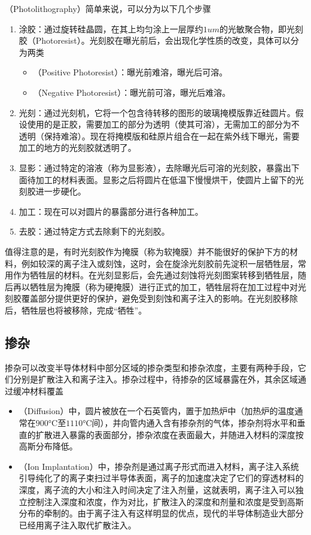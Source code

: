 （Photolithography）简单来说，可以分为以下几个步骤
\begin{enumerate}
    \item 涂胶：通过旋转硅晶圆，在其上均匀涂上一层厚约$1\si{um}$的光敏聚合物，即光刻胶（Photoresist）。光刻胶在曝光前后，会出现化学性质的改变，具体可以分为两类
    \begin{itemize}
        \item {}（Positive Photoresist）\hspace{0.35em}：曝光前难溶，曝光后可溶。
        \item {}（Negative Photoresist）\hspace{0.00em}：曝光前可溶，曝光后难溶。
    \end{itemize}
    \item 光刻：通过光刻机，它将一个包含待转移的图形的玻璃掩模版靠近硅圆片。假设使用的是正胶，需要加工的部分为透明（使其可溶），无需加工的部分为不透明（保持难溶）。现在将掩模版和硅原片组合在一起在紫外线下曝光，需要加工的地方的光刻胶就透明了。
    \item 显影：通过特定的溶液（称为显影液），去除曝光后可溶的光刻胶，暴露出下面待加工的材料表面。显影之后将圆片在低温下慢慢烘干，使圆片上留下的光刻胶进一步硬化。
    \item 加工：现在可以对圆片的暴露部分进行各种加工。
    \item 去胶：通过特定方式去除剩下的光刻胶。
\end{enumerate}

值得注意的是，有时光刻胶作为掩膜（称为软掩膜）并不能很好的保护下方的材料，例如较深的离子注入或刻蚀，这时，会在旋涂光刻胶前先淀积一层牺牲层，常用作为牺牲层的材料。在光刻显影后，会先通过刻蚀将光刻图案转移到牺牲层，随后再以牺牲层为掩膜（称为硬掩膜）进行正式的加工，牺牲层将在加工过程中对光刻胶覆盖部分提供更好的保护，避免受到刻蚀和离子注入的影响。在光刻胶移除后，牺牲层也将被移除，完成“牺牲”。

\subsection{掺杂}
掺杂可以改变半导体材料中部分区域的掺杂类型和掺杂浓度，主要有两种手段，它们分别是扩散注入和离子注入。掺杂过程中，待掺杂的区域暴露在外，其余区域通过缓冲材料覆盖
\begin{itemize}
    \item {}（Diffusion）中，圆片被放在一个石英管内，置于加热炉中（加热炉的温度通常在$900\si{\degreeCelsius}$至$1110\si{\degreeCelsius}$间），并向管内通入含有掺杂剂的气体，掺杂剂将水平和垂直的扩散进入暴露的表面部分，掺杂浓度在表面最大，并随进入材料的深度按高斯分布降低。
    \item {}（Ion Implantation）中，掺杂剂是通过离子形式而进入材料，离子注入系统引导纯化了的离子束扫过半导体表面，离子的加速度决定了它们的穿透材料的深度，离子流的大小和注入时间决定了注入剂量，这就表明，离子注入可以独立控制注入深度和浓度，作为对比，扩散注入的深度和剂量和浓度是受到高斯分布的牵制的。由于离子注入有这样明显的优点，现代的半导体制造业大部分已经用离子注入取代扩散注入。
\end{itemize}

